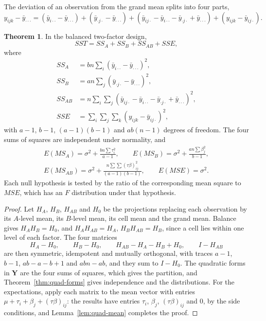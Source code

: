 \documentclass[11pt,a4paper]{article}
\numberwithin{equation}{section}
\theoremstyle{definition}
\newtheorem{thm}{Theorem}[subsection]
\begin{document}
The deviation of an observation from the grand mean splits into four parts,
\[
y_{ijk} - \bar y_{\cdot\cdot\cdot} = (\bar y_{i\cdot\cdot} - \bar y_{\cdot\cdot\cdot}) + (\bar y_{\cdot j\cdot} - \bar y_{\cdot\cdot\cdot}) + (\bar y_{ij\cdot} - \bar y_{i\cdot\cdot} - \bar y_{\cdot j\cdot} + \bar y_{\cdot\cdot\cdot}) + (y_{ijk} - \bar y_{ij\cdot}) .
\]

\begin{thm}\label{thm:two-factor}
In the balanced two-factor design,
\[
SST = SS_A + SS_B + SS_{AB} + SSE ,
\]
where
\begin{align*}
SS_A &= bn\sum_i(\bar y_{i\cdot\cdot} - \bar y_{\cdot\cdot\cdot})^2 , \\
SS_B &= an\sum_j(\bar y_{\cdot j\cdot} - \bar y_{\cdot\cdot\cdot})^2 , \\
SS_{AB} &= n\sum_i\sum_j(\bar y_{ij\cdot} - \bar y_{i\cdot\cdot} - \bar y_{\cdot j\cdot} + \bar y_{\cdot\cdot\cdot})^2 , \\
SSE &= \sum_i\sum_j\sum_k(y_{ijk} - \bar y_{ij\cdot})^2 ,
\end{align*}
with $a - 1$, $b - 1$, $(a - 1)(b - 1)$ and $ab(n - 1)$ degrees of freedom. The four sums of squares are independent under normality, and
\begin{gather*}
E(MS_A) = \sigma^2 + \frac{bn\sum\tau_i^2}{a - 1} , \qquad E(MS_B) = \sigma^2 + \frac{an\sum\beta_j^2}{b - 1} , \\
E(MS_{AB}) = \sigma^2 + \frac{n\sum\sum(\tau\beta)_{ij}^2}{(a - 1)(b - 1)} , \qquad E(MSE) = \sigma^2 .
\end{gather*}
Each null hypothesis is tested by the ratio of the corresponding mean square to $MSE$, which has an $F$ distribution under that hypothesis.
\end{thm}

\begin{proof}
Let $H_A$, $H_B$, $H_{AB}$ and $H_0$ be the projections replacing each observation by its $A$-level mean, its $B$-level mean, its cell mean and the grand
mean. Balance gives $H_AH_B = H_0$, and $H_AH_{AB} = H_A$, $H_BH_{AB} = H_B$, since a cell lies within one level of each factor. The four matrices
\[
H_A - H_0 , \qquad H_B - H_0 , \qquad H_{AB} - H_A - H_B + H_0 , \qquad I - H_{AB}
\]
are then symmetric, idempotent and mutually orthogonal, with traces $a - 1$, $b - 1$, $ab - a - b + 1$ and $abn - ab$, and they sum to $I - H_0$. The quadratic forms
in $\mathbf Y$ are the four sums of squares, which gives the partition, and Theorem~\ref{thm:quad-forms} gives independence and the distributions. For the
expectations, apply each matrix to the mean vector with entries $\mu + \tau_i + \beta_j + (\tau\beta)_{ij}$: the results have entries $\tau_i$, $\beta_j$, $(\tau\beta)_{ij}$ and $0$, by the
side conditions, and Lemma~\ref{lem:quad-mean} completes the proof.
\end{proof}
\end{document}
